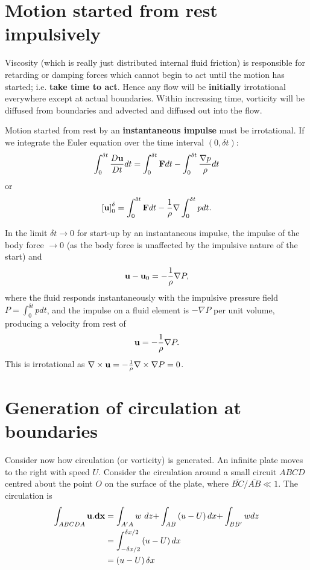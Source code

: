 \documentclass[twoside,a4paper,11pt]{report}
\begin{document}
\section{Motion started from rest impulsively}
Viscosity (which is really just distributed internal fluid friction) is 
responsible for retarding or damping forces which cannot begin to act until 
the motion has started; i.e. \textbf{take time to act}. Hence any flow will 
be \textbf{initially} irrotational everywhere except at actual boundaries. 
Within increasing time, vorticity will be diffused from boundaries and 
advected and diffused out into the flow.

Motion started from rest by an \textbf{instantaneous impulse} must be 
irrotational. If we integrate the Euler equation over the time interval $(0, 
\delta t)$:
\[
\int_0^{\delta t} {\frac{D{{\bf u}}}{Dt}} 
dt=\int_0^{\delta t} {{\bf F}} dt-\int_0^{\delta t} 
{\frac{\nabla p}{\rho }} dt
\]
or 
\[\left[ {{\bf u}} \right]_0^\delta =\int_0^{\delta t} {\rm 
{\bf F}} dt-\frac{1}{\rho }\nabla \int_0^{\delta t} p dt. \]

In the limit $\delta t \to  0$ for start-up by an instantaneous impulse, 
the impulse of the body force $\to  0$ (as the body force is unaffected by 
the impulsive nature of the start) and
\[
{{\bf u}}-{{\bf u}}_{{0}} =-\frac{1}{\rho }\nabla P,
\]
where the fluid responds instantaneously with the impulsive pressure field 
$P=\int_0^{\delta t} {pdt} $, and the impulse on a fluid element is 
$-\nabla P$ per unit volume, producing a velocity from rest of 
\[
{{\bf u}}=-\frac{1}{\rho }\nabla P.
\]
This is irrotational as $\nabla \times {{\bf u}}=-\frac{1}{\rho }\nabla 
\times \nabla P={{0}}$.

\section{Generation of circulation at boundaries}

Consider now how circulation (or vorticity) is generated. An infinite plate 
moves to the right with speed $U$. Consider the circulation around a small 
circuit $ABCD$ centred about the point $O$ on the surface of the plate, where 
${\overline {BC} } / {\overline {AB} }\ll 1$. The 
circulation is
\begin{align*}
 \int_{ABCDA} {{{\bf u}}. {{\bf dx}}} 
 & =\int_{{A}'A} {w\ dz+} \int_{AB} {\left( {u-U} \right)dx+} 
\int_{B{B}'} {wdz} \\ 
 & =\int_{{-\delta x} / 2}^{{\delta x}/ 2} {\left( {u-U} 
\right)dx} \\ 
 & =\left( {u-U} \right)\delta x \\ 
 \end{align*}
\end{document}
